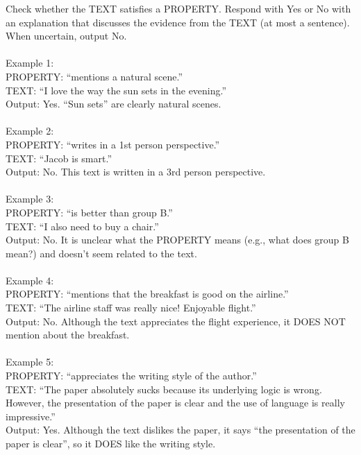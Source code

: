 \begin{figure*}[!htb]
\centering\small
\begin{tcolorbox}[colback=blue!5!white, colframe=blue!75!black, boxrule=0.5mm, arc=4mm, boxsep=5pt, width=\textwidth]
Check whether the TEXT satisfies a PROPERTY. Respond with Yes or No with an explanation that discusses the evidence from the TEXT (at most a sentence). When uncertain, output No. \\
\\
Example 1: \\
PROPERTY: ``mentions a natural scene.'' \\
TEXT: ``I love the way the sun sets in the evening.'' \\
Output: Yes. ``Sun sets'' are clearly natural scenes. \\
\\
Example 2: \\
PROPERTY: ``writes in a 1st person perspective.'' \\
TEXT: ``Jacob is smart.'' \\
Output: No. This text is written in a 3rd person perspective. \\
\\
Example 3: \\
PROPERTY: ``is better than group B.'' \\
TEXT: ``I also need to buy a chair.'' \\
Output: No. It is unclear what the PROPERTY means (e.g., what does group B mean?) and doesn't seem related to the text. \\
\\
Example 4: \\
PROPERTY: ``mentions that the breakfast is good on the airline.'' \\
TEXT: ``The airline staff was really nice! Enjoyable flight.'' \\
Output: No. Although the text appreciates the flight experience, it DOES NOT mention about the breakfast. \\
\\
Example 5: \\
PROPERTY: ``appreciates the writing style of the author.'' \\
TEXT: ``The paper absolutely sucks because its underlying logic is wrong. However, the presentation of the paper is clear and the use of language is really impressive.'' \\
Output: Yes. Although the text dislikes the paper, it says ``the presentation of the paper is clear'', so it DOES like the writing style. \\

\end{tcolorbox}
\end{figure*}

